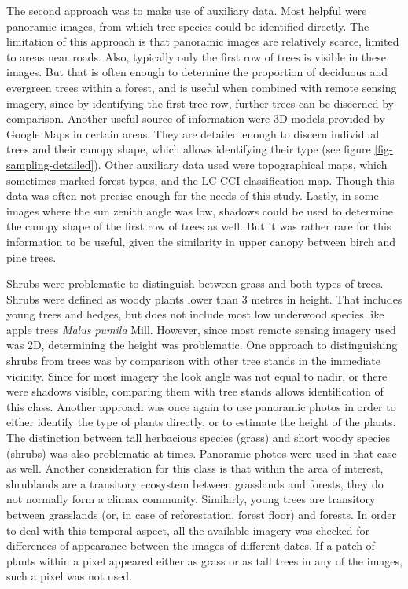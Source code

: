\documentclass[a4paper,10pt]{book}
\begin{document}
The second approach was to make use of auxiliary data. Most helpful were panoramic images, from which tree species could be identified directly. The limitation of this approach is that panoramic images are relatively scarce, limited to areas near roads. Also, typically only the first row of trees is visible in these images. But that is often enough to determine the proportion of deciduous and evergreen trees within a forest, and is useful when combined with remote sensing imagery, since by identifying the first tree row, further trees can be discerned by comparison. Another useful source of information were 3D models provided by Google Maps in certain areas. They are detailed enough to discern individual trees and their canopy shape, which allows identifying their type (see figure \ref{fig-sampling-detailed}). Other auxiliary data used were topographical maps, which sometimes marked forest types, and the LC-CCI classification map. Though this data was often not precise enough for the needs of this study. Lastly, in some images where the sun zenith angle was low, shadows could be used to determine the canopy shape of the first row of trees as well. But it was rather rare for this information to be useful, given the similarity in upper canopy between birch and pine trees.

Shrubs were problematic to distinguish between grass and both types of trees. Shrubs were defined as woody plants lower than 3 metres in height. That includes young trees and hedges, but does not include most low underwood species like apple trees \textit{Malus pumila} Mill. However, since most remote sensing imagery used was 2D, determining the height was problematic. One approach to distinguishing shrubs from trees was by comparison with other tree stands in the immediate vicinity. Since for most imagery the look angle was not equal to nadir, or there were shadows visible, comparing them with tree stands allows identification of this class. Another approach was once again to use panoramic photos in order to either identify the type of plants directly, or to estimate the height of the plants. The distinction between tall herbacious species (grass) and short woody species (shrubs) was also problematic at times. Panoramic photos were used in that case as well. Another consideration for this class is that within the area of interest, shrublands are a transitory ecosystem between grasslands and forests, they do not normally form a climax community. Similarly, young trees are transitory between grasslands (or, in case of reforestation, forest floor) and forests. In order to deal with this temporal aspect, all the available imagery was checked for differences of appearance between the images of different dates. If a patch of plants within a pixel appeared either as grass or as tall trees in any of the images, such a pixel was not used.
\end{document}
